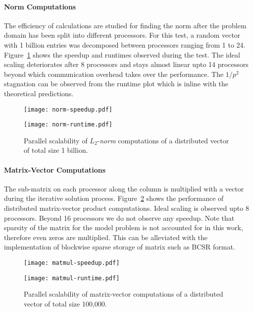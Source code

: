 \documentclass[12pt]{report}
\begin{document}
\paragraph{Norm Computations}

The efficiency of calculations are studied for finding the norm after
the problem domain has been split into different processors. For this
test, a random vector with 1 billion entries was decomposed between
processors ranging from 1 to 24. Figure~\ref{fig:norm} shows the
speedup and runtimes observed during the test.  The ideal scaling
deteriorates after 8 processors and stays almost linear upto 14
processors beyond which communication overhead takes over the
performance. The $1/p^2$ stagnation can be observed from the runtime
plot which is inline with the theoretical predictions.

\begin{figure}[H]
  \centering
  \begin{minipage}{0.45\linewidth}
    \texttt{[image: norm-speedup.pdf]}
    \label{Speedup}
  \end{minipage}
  \begin{minipage}{0.45\linewidth}
    \texttt{[image: norm-runtime.pdf]}
    \label{Runtime}
  \end{minipage}
  \caption{Parallel scalability of $L_2$-\emph{norm} computations of
    a distributed vector of total size 1 billion. }
  \label{fig:norm}
\end{figure}

\paragraph{Matrix-Vector Computations}

The sub-matrix on each processor along the column is multiplied with a
vector during the iterative solution process. Figure~\ref{fig:matmul}
shows the performance of distributed matrix-vector product
computations.  Ideal scaling is observed upto 8 processors. Beyond 16
processors we do not observe any speedup. Note that sparsity of the
matrix for the model problem is not accounted for in this work,
therefore even zeros are multiplied. This can be alleviated with the
implementation of blockwise sparse storage of matrix such as BCSR
format.

\begin{figure}[H]
  \centering
  \begin{minipage}{0.45\linewidth}
    \texttt{[image: matmul-speedup.pdf]}
    \label{Speedup}
  \end{minipage}
  \begin{minipage}{0.45\linewidth}
    \texttt{[image: matmul-runtime.pdf]}
    \label{Runtime}
  \end{minipage}
  \caption{Parallel scalability of matrix-vector computations of
    a distributed vector of total size 100,000. }
  \label{fig:matmul}
\end{figure}
\end{document}
